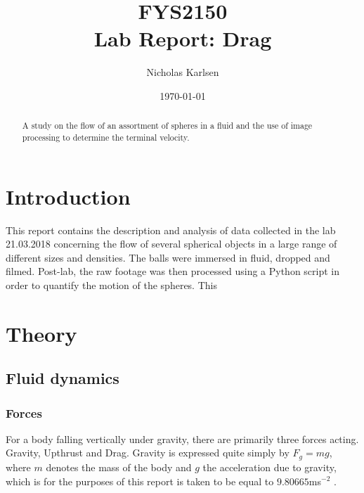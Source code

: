 \documentclass[11pt,a4paper]{article}
\begin{document}

\title{FYS2150 \\ Lab Report: Drag}%

\author{Nicholas Karlsen}

\date{\today}%

\maketitle

\begin{abstract}
  A study on the flow of an assortment of spheres in a fluid and the use of image processing to determine the terminal velocity.
\end{abstract}


\section{\label{sect:intro}Introduction}
  This report contains the description and analysis of data collected in the lab 21.03.2018 concerning the flow of several spherical objects in a large range of different sizes and densities. The balls were immersed in fluid, dropped and filmed. Post-lab, the raw footage was then processed using a Python script in order to quantify the motion of the spheres. This 

\section{\label{sect:theory}Theory}

  \subsection{Fluid dynamics}

    \subsubsection{Forces}
    For a body falling vertically under gravity, there are primarily three forces acting. Gravity, Upthrust and Drag. Gravity is expressed quite simply by $F_g = mg$, where $m$ denotes the mass of the body and $g$ the acceleration due to gravity, which is for the purposes of this report is taken to be equal to $9.80665$ms$^{-2}$ \cite{wiki:grav}. 
\end{document}
